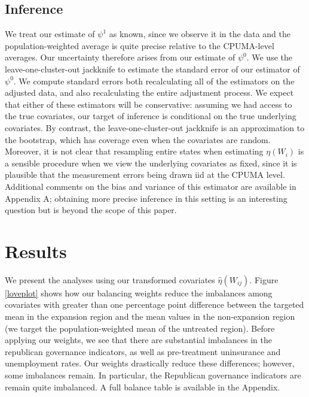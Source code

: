 \documentclass[12pt]{article}
\begin{document}
\subsection{Inference}

We treat our estimate of $\psi^1$ as known, since we observe it in the data and the population-weighted average is quite precise relative to the CPUMA-level averages. Our uncertainty therefore arises from our estimate of $\psi^0$. We use the leave-one-cluster-out jackknife to estimate the standard error of our estimator of $\psi^0$. We compute standard errors both recalculating all of the estimators on the adjusted data, and also recalculating the entire adjustment process. We expect that either of these estimators will be conservative: assuming we had access to the true covariates, our target of inference is conditional on the true underlying covariates. By contrast, the leave-one-cluster-out jackknife is an approximation to the bootstrap, which has coverage even when the covariates are random. Moreover, it is not clear that resampling entire states when estimating $\eta(W_i)$ is a sensible procedure when we view the underlying covariates as fixed, since it is plausible that the measurement errors being drawn iid at the CPUMA level. Additional comments on the bias and variance of this estimator are available in Appendix A; obtaining more precise inference in this setting is an interesting question but is beyond the scope of this paper.

\section{Results}

We present the analyses using our transformed covariates $\hat{\eta}(W_{ij})$. Figure \ref{loveplot} shows how our balancing weights reduce the imbalances among covariates with greater than one percentage point difference between the targeted mean in the expansion region and the mean values in the non-expansion region (we target the population-weighted mean of the untreated region). Before applying our weights, we see that there are substantial imbalances in the republican governance indicators, as well as pre-treatment uninsurance and unemployment rates. Our weights drastically reduce these differences; however, some imbalances remain. In particular, the Republican governance indicators are remain quite imbalanced. A full balance table is available in the Appendix. 
\end{document}
